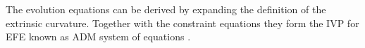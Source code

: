 %

The evolution equations can be derived by expanding the definition of the 
extrinsic curvature.
Together with the constraint equations they form the \ac{IVP} for \ac{EFE} 
known as \ac{ADM} system of equations \citep[\eg][]{Arnowitt:1962hi}.





